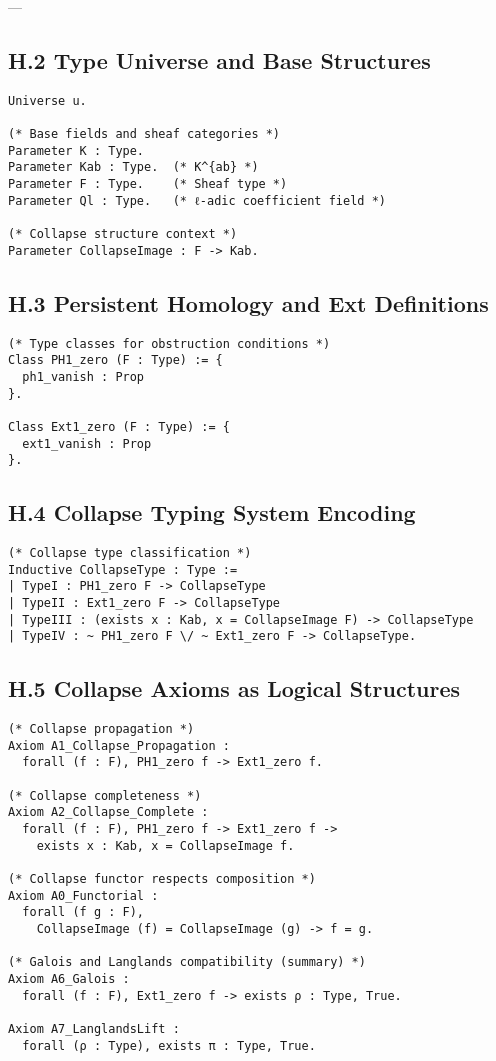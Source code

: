 \documentclass[11pt]{article}
\begin{document}
---

\subsection*{H.2 Type Universe and Base Structures}

\begin{lstlisting}[language=Coq]
Universe u.

(* Base fields and sheaf categories *)
Parameter K : Type.
Parameter Kab : Type.  (* K^{ab} *)
Parameter F : Type.    (* Sheaf type *)
Parameter Ql : Type.   (* ℓ-adic coefficient field *)

(* Collapse structure context *)
Parameter CollapseImage : F -> Kab.
\end{lstlisting}


\subsection*{H.3 Persistent Homology and Ext Definitions}

\begin{lstlisting}[language=Coq]
(* Type classes for obstruction conditions *)
Class PH1_zero (F : Type) := {
  ph1_vanish : Prop
}.

Class Ext1_zero (F : Type) := {
  ext1_vanish : Prop
}.
\end{lstlisting}

\subsection*{H.4 Collapse Typing System Encoding}

\begin{lstlisting}[language=Coq]
(* Collapse type classification *)
Inductive CollapseType : Type :=
| TypeI : PH1_zero F -> CollapseType
| TypeII : Ext1_zero F -> CollapseType
| TypeIII : (exists x : Kab, x = CollapseImage F) -> CollapseType
| TypeIV : ~ PH1_zero F \/ ~ Ext1_zero F -> CollapseType.
\end{lstlisting}

\subsection*{H.5 Collapse Axioms as Logical Structures}

\begin{lstlisting}[language=Coq]
(* Collapse propagation *)
Axiom A1_Collapse_Propagation :
  forall (f : F), PH1_zero f -> Ext1_zero f.

(* Collapse completeness *)
Axiom A2_Collapse_Complete :
  forall (f : F), PH1_zero f -> Ext1_zero f ->
    exists x : Kab, x = CollapseImage f.

(* Collapse functor respects composition *)
Axiom A0_Functorial :
  forall (f g : F),
    CollapseImage (f) = CollapseImage (g) -> f = g.

(* Galois and Langlands compatibility (summary) *)
Axiom A6_Galois :
  forall (f : F), Ext1_zero f -> exists ρ : Type, True.

Axiom A7_LanglandsLift :
  forall (ρ : Type), exists π : Type, True.
\end{lstlisting}
\end{document}
